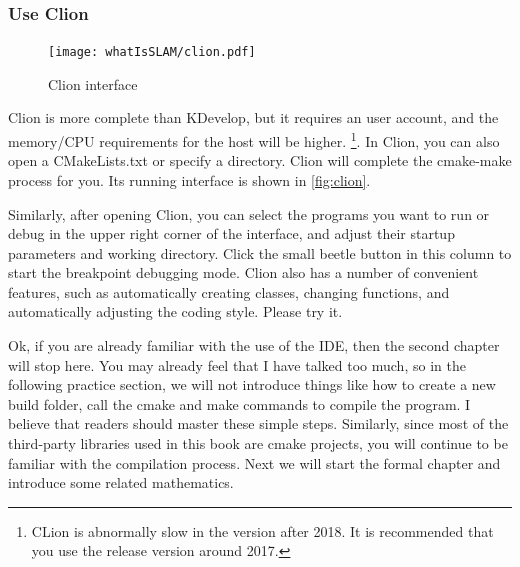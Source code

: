 \subsubsection{Use Clion}
\begin{figure}[!t]
    \centering
    \texttt{[image: whatIsSLAM/clion.pdf]}
    \caption{Clion interface}
    \label{fig:clion}
\end{figure}

Clion is more complete than KDevelop, but it requires an user account, and the memory/CPU requirements for the host will be higher. \footnote{CLion is abnormally slow in the version after 2018. It is recommended that you use the release version around 2017. }. In Clion, you can also open a CMakeLists.txt or specify a directory. Clion will complete the cmake-make process for you. Its running interface is shown in \autoref{fig:clion}.

Similarly, after opening Clion, you can select the programs you want to run or debug in the upper right corner of the interface, and adjust their startup parameters and working directory. Click the small beetle button in this column to start the breakpoint debugging mode. Clion also has a number of convenient features, such as automatically creating classes, changing functions, and automatically adjusting the coding style. Please try it.

Ok, if you are already familiar with the use of the IDE, then the second chapter will stop here. You may already feel that I have talked too much, so in the following practice section, we will not introduce things like how to create a new build folder, call the cmake and make commands to compile the program. I believe that readers should master these simple steps. Similarly, since most of the third-party libraries used in this book are cmake projects, you will continue to be familiar with the compilation process. Next we will start the formal chapter and introduce some related mathematics.

